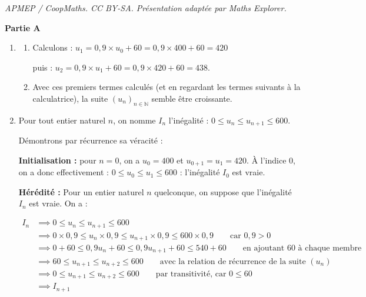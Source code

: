 \documentclass[10pt]{article}
\providecommand{\N}{\mathbb{N}}
\begin{document}
\noindent\textit{APMEP / CoopMaths. CC BY-SA. Présentation adaptée par Maths Explorer.}\par\medskip
\medskip

	\textbf{Partie A}

	\medskip


	\begin{enumerate}
	\item \begin{enumerate}
		\item Calculons : $u_1 = 0,9 \times u_0 + 60 = 0,9\times 400 + 60 = 420$

		puis : $u_2= 0,9 \times u_1 + 60 = 0,9\times 420 + 60 = 438$.
		\item Avec ces premiers termes calculés (et en regardant les termes suivants à la calculatrice), la suite $(u_n)_{n \in \N}$ semble être croissante.
		\end{enumerate}
	\item Pour tout entier naturel $n$, on nomme $I_n$ l'inégalité : \quad $0  \leqslant u_n  \leqslant u_{n+1} \leqslant  600$.

	Démontrons par récurrence sa véracité :

	\textbf{Initialisation :} pour $n = 0$, on a $u_0 = 400$ et $u_{0+1} = u_1 = 420$. À l'indice 0, on a donc effectivement : $0\leqslant u_0 \leqslant u_1 \leqslant 600 $ : l'inégalité $I_0$ est vraie.

	\smallskip
	\textbf{Hérédité :} Pour un entier naturel $n$ quelconque, on suppose que l'inégalité $I_n$ est vraie. On a :

$\begin{aligned} I_n &\implies 0  \leqslant u_n  \leqslant u_{n+1} \leqslant  600\\
		&\implies 0\times 0,9  \leqslant u_n \times 0,9 \leqslant u_{n+1}\times 0,9 \leqslant  600\times 0,9 \qquad \text{car }0,9>0\\
		&\implies 0 + 60  \leqslant 0,9u_n + 60 \leqslant 0,9u_{n+1} + 60 \leqslant  540 + 60 \qquad \text{en ajoutant 60 à chaque membre}\\
		&\implies 60 \leqslant u_{n + 1} \leqslant u_{n+2} \leqslant  600 \qquad \text{avec la relation de récurrence de la suite } (u_n)\\
		&\implies 0 \leqslant u_{n + 1} \leqslant u_{n+2} \leqslant  600 \qquad \text{par transitivité, car } 0 \leqslant 60\\
		&\implies I_{n+1} \\ \end{aligned} $


\end{enumerate}
\end{document}
